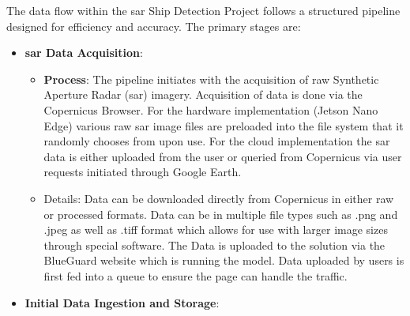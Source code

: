\documentclass{article}
\begin{document}
The data flow within the \acrshort{sar} Ship Detection Project follows a structured pipeline designed for efficiency and accuracy. The primary stages are:
\begin{itemize}
    \item \textbf{\acrshort{sar} Data Acquisition}:
    \begin{itemize}
        \item \textbf{Process}: The pipeline initiates with the acquisition of raw Synthetic Aperture Radar (\acrshort{sar}) imagery. Acquisition of data is done via the Copernicus Browser. For the hardware implementation (Jetson Nano Edge) various raw \acrshort{sar} image files are preloaded into the file system that it randomly chooses from upon use. For the cloud implementation the \acrshort{sar} data is either uploaded from the user or queried from Copernicus via user requests initiated through Google Earth. \item Details: Data can be downloaded directly from Copernicus in either raw or processed formats. Data can be in multiple file types such as .png and .jpeg as well as .tiff format which allows for use with larger image sizes through special software. The Data is uploaded to the solution via the BlueGuard website which is running the model. Data uploaded by users is first fed into a queue to ensure the page can handle the traffic. \end{itemize}
    \item \textbf{Initial Data Ingestion and Storage}:
    \begin{itemize}

\end{itemize}
\end{itemize}
\end{document}
